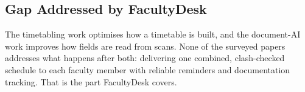 \subsection*{Gap Addressed by FacultyDesk}
The timetabling work optimises how a timetable is built, and the document-AI work improves how fields are read from scans. None of the surveyed papers addresses what happens after both: delivering one combined, clash-checked schedule to each faculty member with reliable reminders and documentation tracking. That is the part FacultyDesk covers.
